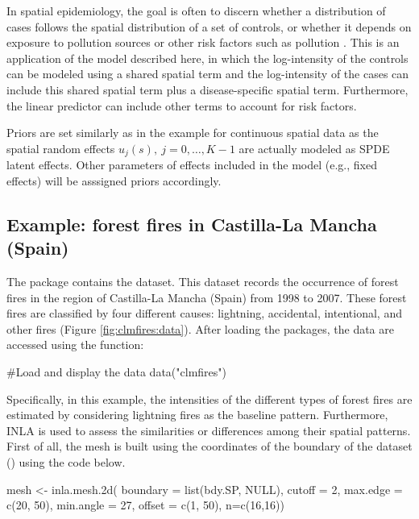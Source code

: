 \medskip
In spatial epidemiology, the goal is often to discern whether a distribution of cases follows the spatial distribution of a set of controls, or whether it depends on exposure to pollution sources or other risk factors such as pollution \citep{PalmiPerales2019Biometrical}. This is an application of the model described here, in which the log-intensity of the controls can be modeled using a shared spatial term and the log-intensity of the cases can include this shared spatial term plus a disease-specific spatial term. Furthermore, the linear predictor can include other terms to account for risk factors.

\medskip
Priors are set similarly as in the example for continuous spatial data as the spatial random effects $u_j(s),\ j=0,\ldots,K-1$ are actually modeled as SPDE latent effects. Other parameters of effects included in the model (e.g., fixed effects) will be asssigned priors accordingly.
 

\subsection{Example: forest fires in Castilla-La Mancha (Spain)}
\label{exam:mpp}


\medskip
The  package contains the  dataset. This dataset records the occurrence of forest fires in the region of Castilla-La Mancha (Spain) from 1998 to 2007. These forest fires are classified by four different causes: lightning, accidental, intentional, and other fires (Figure \ref{fig:clmfires:data}). After loading the packages, the data are accessed using the  function:

\begin{example*}
#Load and display the data
data("clmfires")
\end{example*}

Specifically, in this example, the intensities of the different types of forest fires are estimated by considering lightning fires as the baseline pattern. Furthermore, INLA is used to assess the similarities or differences among their spatial patterns. First of all, the mesh is built using the coordinates of the boundary of the dataset () using the code below.

\begin{example*}
mesh <- inla.mesh.2d(
  boundary = list(bdy.SP, NULL), cutoff = 2, max.edge = c(20, 50),
  min.angle = 27, offset = c(1, 50), n=c(16,16))
\end{example*}



